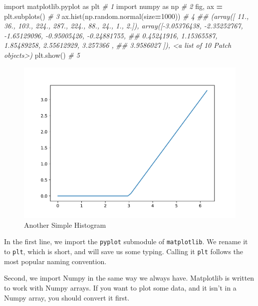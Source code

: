 \documentclass[
  12pt,
  krantz2]{krantz}
\makeatletter
\newenvironment{Shaded}{\begin{snugshade}}{\end{snugshade}}
\newcommand{\CommentTok}[1]{\textcolor[rgb]{0.37,0.37,0.37}{\textit{#1}}}
\newcommand{\DecValTok}[1]{\textcolor[rgb]{0.06,0.06,0.06}{#1}}
\newcommand{\ImportTok}[1]{#1}
\newcommand{\NormalTok}[1]{#1}
\newcommand{\OperatorTok}[1]{\textcolor[rgb]{0.43,0.43,0.43}{\textbf{#1}}}
\newenvironment{kframe}{%
\medskip{}
\setlength{\fboxsep}{.8em}
 \def\at@end@of@kframe{}%
 \ifinner\ifhmode%
  \def\at@end@of@kframe{\end{minipage}}%
  \begin{minipage}{\columnwidth}%
 \fi\fi%
 \def\FrameCommand##1{\hskip\@totalleftmargin \hskip-\fboxsep
 \colorbox{shadecolor}{##1}\hskip-\fboxsep
     \hskip-\linewidth \hskip-\@totalleftmargin \hskip\columnwidth}%
 \MakeFramed {\advance\hsize-\width
   \@totalleftmargin\z@ \linewidth\hsize
   \@setminipage}}%
 {\par\unskip\endMakeFramed%
 \at@end@of@kframe}
\renewenvironment{Shaded}{\begin{kframe}}{\end{kframe}}
\makeatother
\begin{document}
\begin{Shaded}
\begin{Highlighting}[]
\ImportTok{import}\NormalTok{ matplotlib.pyplot }\ImportTok{as}\NormalTok{ plt       }\CommentTok{\# 1}
\ImportTok{import}\NormalTok{ numpy }\ImportTok{as}\NormalTok{ np                    }\CommentTok{\# 2}
\NormalTok{fig, ax }\OperatorTok{=}\NormalTok{ plt.subplots()              }\CommentTok{\# 3}
\NormalTok{ax.hist(np.random.normal(size}\OperatorTok{=}\DecValTok{1000}\NormalTok{))  }\CommentTok{\# 4}
\CommentTok{\#\# (array([ 11.,  36., 103., 224., 287., 224.,  88.,  24.,   1.,   2.]), array([{-}3.05376438, {-}2.35252767, {-}1.65129096, {-}0.95005426, {-}0.24881755,}
\CommentTok{\#\#         0.45241916,  1.15365587,  1.85489258,  2.55612929,  3.257366  ,}
\CommentTok{\#\#         3.9586027 ]), \textless{}a list of 10 Patch objects\textgreater{})}
\NormalTok{plt.show()                            }\CommentTok{\# 5}
\end{Highlighting}
\end{Shaded}

\begin{figure}
\includegraphics[width=0.8\linewidth]{r_and_python_book_files/figure-latex/unnamed-chunk-227-1} \caption{Another Simple Histogram}\label{fig:unnamed-chunk-227}
\end{figure}

In the first line, we import the \texttt{pyplot} submodule of \texttt{matplotlib}. We rename it to \texttt{plt}, which is short, and will save us some typing. Calling it \texttt{plt} follows the most popular naming convention.

Second, we import Numpy in the same way we always have. Matplotlib is written to work with Numpy arrays. If you want to plot some data, and it isn't in a Numpy array, you should convert it first.
\end{document}
